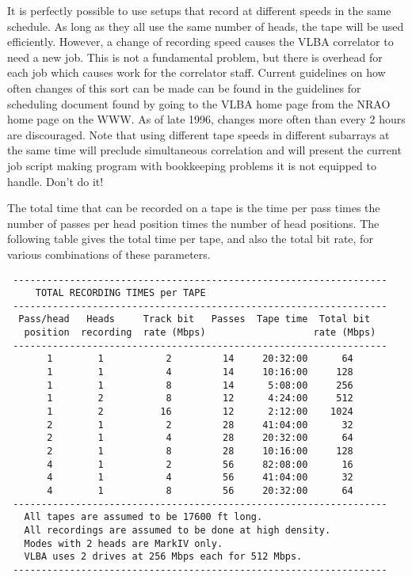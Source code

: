 \documentclass{report}
\begin{document}
It is perfectly possible to use setups that record at different speeds
in the same schedule.  As long as they all use the same number of
heads, the tape will be used efficiently.  However, a change of
recording speed causes the VLBA correlator to need a new job.  This is
not a fundamental problem, but there is overhead for each job which
causes work for the correlator staff.  Current guidelines on how often
changes of this sort can be made can be found in the guidelines for
scheduling document found by going to the VLBA home page from the NRAO
home page on the WWW.  As of late 1996, changes more often than every
2 hours are discouraged.  Note that using different tape speeds in
different subarrays at the same time will preclude simultaneous
correlation and will present the current job script making program
with bookkeeping problems it is not equipped to handle.  Don't do it!

The total time that can be recorded on a tape is the time per pass
times the number of passes per head position times the number of head
positions.  The following table gives the total time per tape, and
also the total bit rate, for various combinations of these parameters.


\begin{verbatim}
 ------------------------------------------------------------------
     TOTAL RECORDING TIMES per TAPE
 ------------------------------------------------------------------
  Pass/head   Heads     Track bit   Passes  Tape time  Total bit
   position  recording  rate (Mbps)                   rate (Mbps)
 ------------------------------------------------------------------
       1        1           2         14     20:32:00      64
       1        1           4         14     10:16:00     128
       1        1           8         14      5:08:00     256
       1        2           8         12      4:24:00     512
       1        2          16         12      2:12:00    1024
       2        1           2         28     41:04:00      32
       2        1           4         28     20:32:00      64
       2        1           8         28     10:16:00     128
       4        1           2         56     82:08:00      16
       4        1           4         56     41:04:00      32
       4        1           8         56     20:32:00      64
 ------------------------------------------------------------------
   All tapes are assumed to be 17600 ft long.
   All recordings are assumed to be done at high density.
   Modes with 2 heads are MarkIV only.
   VLBA uses 2 drives at 256 Mbps each for 512 Mbps.
 ------------------------------------------------------------------

\end{verbatim}
\end{document}
